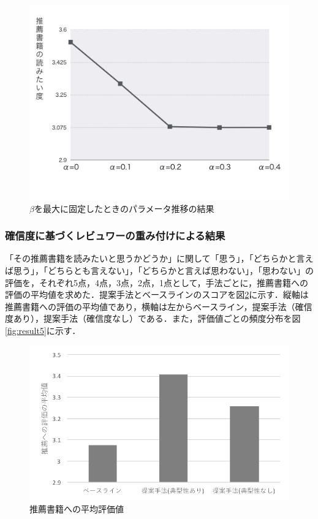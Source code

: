 \documentclass[a4paper,11pt,oneside,openany]{jsbook}
\begin{document}
\begin{figure}[htb]
	\begin{center} %
		\includegraphics [width = 120mm] {figures/res_beta.jpeg} %
	\end{center}
	\caption{$\beta$を最大に固定したときのパラメータ推移の結果} %
	\label{fig:result3} %
\end{figure}


		\subsubsection{確信度に基づくレビュワーの重み付けによる結果}

「その推薦書籍を読みたいと思うかどうか」に関して「思う」，「どちらかと言えば思う」，「どちらとも言えない」，「どちらかと言えば思わない」，「思わない」の評価を，それぞれ5点，4点，3点，2点，1点として，手法ごとに，推薦書籍への評価の平均値を求めた．提案手法とベースラインのスコアを図\ref{fig:result4}に示す．縦軸は推薦書籍への評価の平均値であり，横軸は左からベースライン，提案手法（確信度あり），提案手法（確信度なし）である．また，評価値ごとの頻度分布を図\ref{fig:result5}に示す．
\begin{figure}[htb]
	\begin{center} %
		\includegraphics [width = 120mm] {figures/result2.pdf} %
	\end{center}
	\caption{推薦書籍への平均評価値} %
	\label{fig:result4} %
\end{figure}
\end{document}
